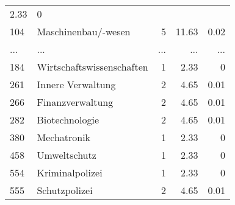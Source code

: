 \begin{longtable}{lXrrr}
          \num[round-mode=places,round-precision=2]{2,33} &
          \num[round-mode=places,round-precision=2]{0} \\
        104 & \multicolumn{1}{X}{Maschinenbau/-wesen} & %
          \num{5} &
          \num[round-mode=places,round-precision=2]{11,63} &
          \num[round-mode=places,round-precision=2]{0,02} \\
       ... & ... & ... & ... & ... \\
        184 & \multicolumn{1}{X}{Wirtschaftswissenschaften} & %
          \num{1} &
          \num[round-mode=places,round-precision=2]{2,33} &
          \num[round-mode=places,round-precision=2]{0} \\

        261 & \multicolumn{1}{X}{Innere Verwaltung} & %
          \num{2} &
          \num[round-mode=places,round-precision=2]{4,65} &
          \num[round-mode=places,round-precision=2]{0,01} \\

        266 & \multicolumn{1}{X}{Finanzverwaltung} & %
          \num{2} &
          \num[round-mode=places,round-precision=2]{4,65} &
          \num[round-mode=places,round-precision=2]{0,01} \\

        282 & \multicolumn{1}{X}{Biotechnologie} & %
          \num{2} &
          \num[round-mode=places,round-precision=2]{4,65} &
          \num[round-mode=places,round-precision=2]{0,01} \\

        380 & \multicolumn{1}{X}{Mechatronik} & %
          \num{1} &
          \num[round-mode=places,round-precision=2]{2,33} &
          \num[round-mode=places,round-precision=2]{0} \\

        458 & \multicolumn{1}{X}{Umweltschutz} & %
          \num{1} &
          \num[round-mode=places,round-precision=2]{2,33} &
          \num[round-mode=places,round-precision=2]{0} \\

        554 & \multicolumn{1}{X}{Kriminalpolizei} & %
          \num{1} &
          \num[round-mode=places,round-precision=2]{2,33} &
          \num[round-mode=places,round-precision=2]{0} \\

        555 & \multicolumn{1}{X}{Schutzpolizei} & %
          \num{2} &
          \num[round-mode=places,round-precision=2]{4,65} &
          \num[round-mode=places,round-precision=2]{0,01} \\


\end{longtable}
